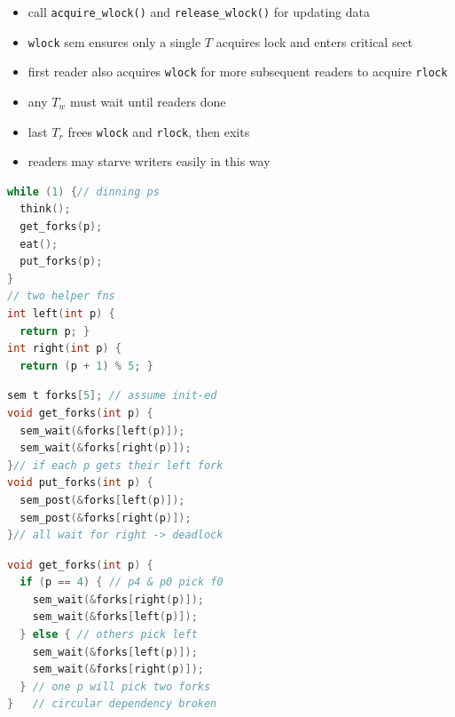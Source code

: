 \begin{minipage}{.37\linewidth}
  \flushleft
  \begin{itemize}
  \item call \texttt{acquire\_wlock()} and \texttt{release\_wlock()} for updating data
  \item \texttt{wlock} sem ensures only a single $T$ acquires lock and enters critical sect
  \item first reader also acquires \texttt{wlock} for more subsequent readers to acquire \texttt{rlock}
  \item any $T_w$ must wait until  readers done
  \item last $T_r$ frees \texttt{wlock} and \texttt{rlock}, then exits
  \item readers may starve writers easily in this way
  \end{itemize}
\begin{lstlisting}[language=c,xleftmargin=4pt,xrightmargin=3pt]
while (1) {// dinning ps
  think();
  get_forks(p);
  eat();
  put_forks(p);
}
// two helper fns
int left(int p) {
  return p; }
int right(int p) {
  return (p + 1) % 5; }
\end{lstlisting}
\end{minipage}
\begin{minipage}{.5\linewidth}
\begin{lstlisting}[language=c,xrightmargin=2pt]
sem t forks[5]; // assume init-ed
void get_forks(int p) {
  sem_wait(&forks[left(p)]);
  sem_wait(&forks[right(p)]);
}// if each p gets their left fork
void put_forks(int p) {
  sem_post(&forks[left(p)]);
  sem_post(&forks[right(p)]);
}// all wait for right -> deadlock
\end{lstlisting}
\end{minipage}
\begin{minipage}{.5\linewidth}
\begin{lstlisting}[language=c,xleftmargin=4pt]
void get_forks(int p) {
  if (p == 4) { // p4 & p0 pick f0
    sem_wait(&forks[right(p)]);
    sem_wait(&forks[left(p)]);
  } else { // others pick left
    sem_wait(&forks[left(p)]);
    sem_wait(&forks[right(p)]);
  } // one p will pick two forks
}   // circular dependency broken
\end{lstlisting}
\end{minipage}

